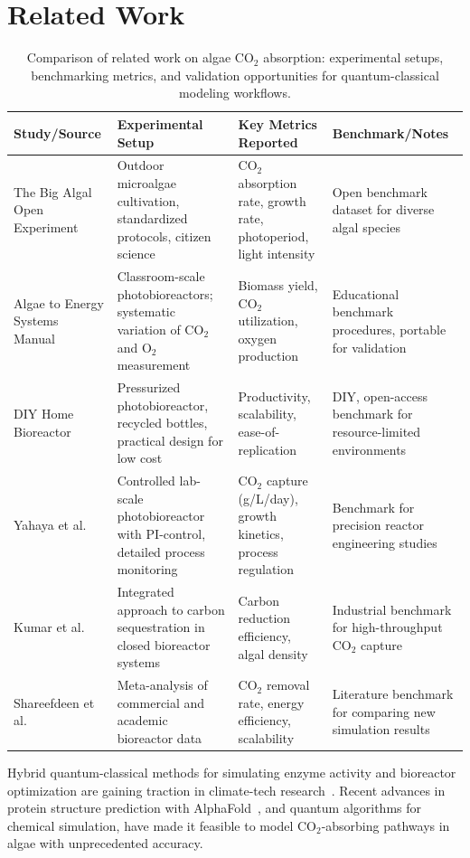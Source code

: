\documentclass{article}
\begin{document}
\section{Related Work}
\begin{table}[ht]
\centering
\begin{tabular}{|p{3cm}|p{4cm}|p{4cm}|p{3cm}|}
\hline
\textbf{Study/Source} & \textbf{Experimental Setup} & \textbf{Key Metrics Reported} & \textbf{Benchmark/Notes} \\
\hline
The Big Algal Open Experiment~\cite{bigalgae2018} & Outdoor microalgae cultivation, standardized protocols, citizen science & CO$_2$ absorption rate, growth rate, photoperiod, light intensity & Open benchmark dataset for diverse algal species \\
\hline
Algae to Energy Systems Manual~\cite{algae2energy_manual} & Classroom-scale photobioreactors; systematic variation of CO$_2$ and O$_2$ measurement & Biomass yield, CO$_2$ utilization, oxygen production & Educational benchmark procedures, portable for validation \\
\hline
DIY Home Bioreactor~\cite{instructables_bioreactor} & Pressurized photobioreactor, recycled bottles, practical design for low cost & Productivity, scalability, ease-of-replication & DIY, open-access benchmark for resource-limited environments \\
\hline
Yahaya et al.~\cite{yahaya2025} & Controlled lab-scale photobioreactor with PI-control, detailed process monitoring & CO$_2$ capture (g/L/day), growth kinetics, process regulation & Benchmark for precision reactor engineering studies \\
\hline
Kumar et al.~\cite{kumar2021} & Integrated approach to carbon sequestration in closed bioreactor systems & Carbon reduction efficiency, algal density & Industrial benchmark for high-throughput CO$_2$ capture \\
\hline
Shareefdeen et al.~\cite{shareefdeen2023} & Meta-analysis of commercial and academic bioreactor data & CO$_2$ removal rate, energy efficiency, scalability & Literature benchmark for comparing new simulation results \\
\hline
\end{tabular}
\caption{Comparison of related work on algae CO$_2$ absorption: experimental setups, benchmarking metrics, and validation opportunities for quantum-classical modeling workflows.}
\label{tab:related_work_benchmarks}
\end{table}

Hybrid quantum-classical methods for simulating enzyme activity and bioreactor optimization are gaining traction in climate-tech research~\cite{kais2024,mcardle2020,cao2019,bravyi2002}. Recent advances in protein structure prediction with AlphaFold~\cite{alphafold_nature,alphafold_db}, and quantum algorithms for chemical simulation, have made it feasible to model CO$_2$-absorbing pathways in algae with unprecedented accuracy.
\end{document}
